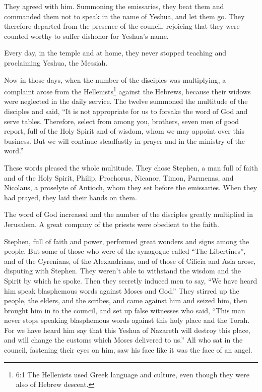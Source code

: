 \myverse{}They agreed with him. Summoning the emissaries, they beat them
and commanded them not to speak in the name of Yeshua, and let them go.
\myverse{}They therefore departed from the presence of the council, rejoicing that they
were counted worthy to suffer dishonor for Yeshua’s name.

\myverse{}Every day, in the temple and at home, they never stopped teaching
and proclaiming Yeshua, the Messiah.


\mychapter{} \myverse*{}Now in those days, when the number of the disciples was multiplying,
a complaint arose from the Hellenists\footnote{6:1 The Hellenists used Greek language and culture, even though they were also of Hebrew descent.}
against the Hebrews, because their widows were neglected in the daily service.
\myverse{}The twelve summoned the multitude of the disciples and said, “It is not appropriate
for us to forsake the word of God and serve tables.
\myverse{}Therefore, select from among you, brothers, seven men of good report, full of
the Holy Spirit and of wisdom, whom we may appoint over this business.
\myverse{}But we will continue steadfastly in prayer and in the ministry of the word.”

\myverse{}These words pleased the whole multitude. They chose Stephen, a
man full of faith and of the Holy Spirit, Philip, Prochorus, Nicanor, Timon, Parmenas, and Nicolaus, a
proselyte of Antioch,
\myverse{}whom they set before the emissaries. When they had prayed, they laid their hands
on them.

\myverse{}The word of God increased and the number of the disciples greatly
multiplied in Jerusalem. A great company of the priests were obedient to the faith.

\myverse{}Stephen, full of faith and power, performed great wonders and signs
among the people.
\myverse{}But some of those who were of the synagogue called “The Libertines”, and of
the Cyrenians, of the Alexandrians, and of those of Cilicia and Asia arose, disputing with Stephen.
\myverse{}They weren’t able to withstand the wisdom and the Spirit by which he spoke.
\myverse{}Then they secretly induced men to say, “We have heard him speak blasphemous
words against Moses and God.”
\myverse{}They stirred up the people, the elders, and the scribes, and came against
him and seized him, then brought him in to the council,
\myverse{}and set up false witnesses who said, “This man never stops speaking blasphemous
words against this holy place and the Torah.
\myverse{}For we have heard him say that this Yeshua of Nazareth will destroy this place,
and will change the customs which Moses delivered to us.”
\myverse{}All who sat in the council, fastening their eyes on him, saw his face like
it was the face of an angel.


